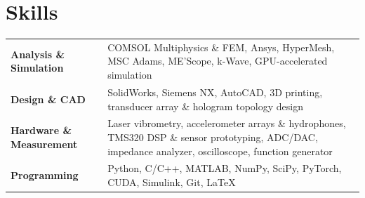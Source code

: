 \documentclass[10pt,letterpaper]{article}
\newcommand{\skillrow}[2]{\textbf{\color{navy}#1} & #2 \\[3pt]}
\begin{document}
\section{Skills}

{\small
\begin{tabularx}{\textwidth}{@{}p{1.65in} X@{}}
  \skillrow{Analysis \& Simulation}{COMSOL Multiphysics \& FEM, Ansys, HyperMesh, MSC Adams, ME'Scope, k-Wave, GPU-accelerated simulation}
  \skillrow{Design \& CAD}{SolidWorks, Siemens NX, AutoCAD, 3D printing, transducer array \& hologram topology design}
  \skillrow{Hardware \& Measurement}{Laser vibrometry, accelerometer arrays \& hydrophones, TMS320 DSP \& sensor prototyping, ADC/DAC, impedance analyzer, oscilloscope, function generator}
  \skillrow{Programming}{Python, C/C++, MATLAB, NumPy, SciPy, PyTorch, CUDA, Simulink, Git, \LaTeX}
\end{tabularx}}
\end{document}
